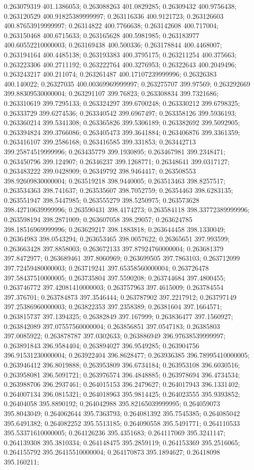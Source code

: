 0.263079319 401.1386053; 0.263088263 401.0829285; 0.26309432 400.9756438; 0.263120529 400.91825389999997; 0.263116336 400.9121723; 0.263126603 400.87653919999997; 0.26314822 400.7766638; 0.263142608 400.717004; 0.263150468 400.6715633; 0.263165628 400.5981985; 0.263183977 400.60552210000003; 0.263169438 400.500336; 0.263178844 400.4468007; 0.263194164 400.4485138; 0.263193383 400.3795175; 0.263211254 400.375663; 0.263223306 400.2711192; 0.263222764 400.3276953; 0.26322643 400.2049496; 0.263243217 400.211074; 0.263261487 400.17107239999996; 0.26326383 400.140022; 0.26327035 400.00369969999997; 0.263275707 399.97569; 0.263292669 399.88309530000004; 0.263291107 399.76823; 0.263308834 399.7321686; 0.263310619 399.7295133; 0.263324297 399.6700248; 0.263330212 399.6798325; 0.26333729 399.6274536; 0.263340542 399.6967497; 0.263358126 399.5936193; 0.263360214 399.5341308; 0.263365826 399.5306189; 0.263382692 399.5092905; 0.263394824 399.3766086; 0.263405473 399.3641884; 0.263406876 399.3361359; 0.263416107 399.2586168; 0.263416585 399.331853; 0.263442713 399.25874519999996; 0.263435779 399.1930895; 0.263467981 399.2348471; 0.263450796 399.124907; 0.26346237 399.1268771; 0.26348641 399.0317127; 0.263483222 399.0428909; 0.26349792 398.9464417; 0.263508553 398.92609830000004; 0.263519218 398.9440005; 0.263513463 398.8257517; 0.263534363 398.741637; 0.263535607 398.7052759; 0.26354463 398.6283135; 0.263551947 398.5447985; 0.263555279 398.5250975; 0.263573628 398.42710639999996; 0.263590431 398.4174273; 0.263584118 398.33772389999996; 0.263598194 398.2871009; 0.263607058 398.29057; 0.263624785 398.18516969999996; 0.263629217 398.1883818; 0.263644458 398.1330049; 0.26364983 398.0543294; 0.263653465 398.0057622; 0.26365651 397.993599; 0.263663428 397.8858003; 0.263672133 397.87924760000004; 0.263681379 397.8472977; 0.263689461 397.8060969; 0.263699505 397.7863103; 0.263712099 397.72459480000003; 0.263719241 397.65358560000004; 0.263726478 397.58437510000005; 0.263735804 397.5590208; 0.263744684 397.4800455; 0.263746772 397.42081410000003; 0.263757963 397.4615009; 0.263784554 397.376701; 0.263784873 397.3546444; 0.263787902 397.2217912; 0.263797149 397.25386960000003; 0.263822353 397.2358389; 0.26381604 397.1664571; 0.263815737 397.1394325; 0.26382849 397.167999; 0.263836477 397.1560927; 0.263842089 397.07557560000004; 0.263856851 397.0547183; 0.26385803 397.0085922; 0.263878787 397.0302633; 0.263886949 396.97638539999997; 0.263891843 396.9584404; 0.263894027 396.9549285; 0.263904756 396.91531230000004; 0.263922404 396.8628477; 0.263936385 396.78995410000005; 0.263946412 396.8019888; 0.263953809 396.6734184; 0.263953108 396.6030516; 0.263958081 396.5091721; 0.263976574 396.4848885; 0.263978694 396.4734534; 0.263988706 396.2937461; 0.264015153 396.2479627; 0.264017943 396.1331402; 0.264007134 396.0815321; 0.264018963 395.9814425; 0.264023555 395.9393852; 0.26404058 395.8890192; 0.264042988 395.82165039999995; 0.264059073 395.8043049; 0.264062644 395.7363793; 0.264081392 395.7545385; 0.264085042 395.6491382; 0.264082252 395.5513185; 0.264090558 395.5491771; 0.264110533 395.53371610000005; 0.264126236 395.4351683; 0.264117069 395.3241147; 0.264139308 395.3810334; 0.264148475 395.2859119; 0.264153369 395.2516065; 0.264155792 395.26415510000004; 0.264170873 395.1894627; 0.26418098 395.160211; 